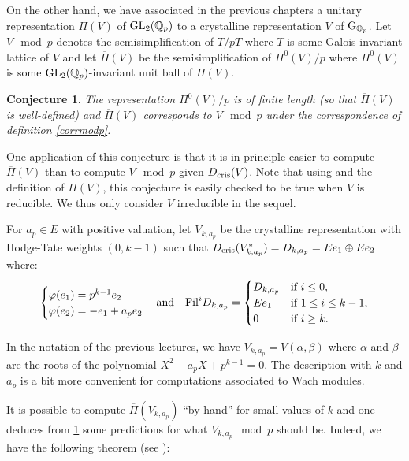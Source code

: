 \documentclass[11pt]{amsart}
\def\Q{{\mathbb Q}_p}
\def\g{{\rm G}_{\Q}}
\def\G{{\rm GL}_2(\Q)}
\def\dcris{D_{\rm cris}}
\newtheorem{conj}[definit]{\bf{Conjecture}}
\begin{document}
On the other hand, we have associated in the previous  
chapters a unitary representation $\Pi(V)$ of  
$\G$ to a crystalline representation 
$V$ of $\g$. Let $V \mod{p}$ denotes the semisimplification of  
$T/pT$ where $T$ is some Galois invariant lattice of $V$ and  
let $\overline{\Pi}(V)$ be the semisimplification of $\Pi^0(V)/p$ 
where $\Pi^0(V)$ is some $\G$-invariant unit ball of $\Pi(V)$. 
 
\begin{conj}\label{chrisconj} 
The representation $\Pi^0(V)/p$ is of finite length  
(so that $\overline{\Pi}(V)$ is well-defined) and 
$\overline{\Pi}(V)$ corresponds to $V \mod{p}$ 
under the correspondence of definition \ref{corrmodp}. 
\end{conj} 

One application of this conjecture is that it is in principle  
easier to compute $\overline{\Pi}(V)$ than to compute $V \mod{p}$  
given $\dcris(V)$. Note that using \cite{BL} and the definition of $\Pi(V)$, this conjecture is easily checked to be true when $V$ is reducible. We thus only consider $V$ irreducible in the sequel.

For $a_p\in E$ with positive valuation, let $V_{k,a_p}$ be the crystalline representation with Hodge-Tate weights $(0,k-1)$ such that 
$\dcris(V_{k,a_p}^*) = D_{k, a_p} = E e_1 
\oplus E e_2$ where: 
\[ \begin{cases} \varphi(e_1) = p^{k-1} e_2 \\ 
\varphi(e_2) = -e_1 + a_p e_2  
\end{cases} 
\text{and}\quad 
{\rm Fil}^i D_{k, a_p} = \begin{cases} 
D_{k, a_p} & \text{if $i \leq 0$,} \\ 
E e_1 & \text{if $1 \leq i \leq k-1$,} \\ 
0 & \text{if $i \geq k$.} 
\end{cases} \] 
 
In the notation of the previous lectures, we have 
$V_{k,a_p}=V(\alpha,\beta)$ where  
$\alpha$ and $\beta$ are the roots 
of the polynomial $X^2- a_p X + p^{k-1} = 0$. 
The description with $k$ and $a_p$ is a bit more convenient for 
computations associated to Wach modules. 
 
It is possible to compute $\overline{\Pi}(V_{k,a_p})$  
``by hand'' for small values of $k$ and one deduces  
from \ref{chrisconj} some predictions for what 
$V_{k,a_p} \mod{p}$ should be. Indeed, we have the following theorem 
(see \cite[th\'eor\`eme 1.4]{Br2}): 
 
\end{document}
